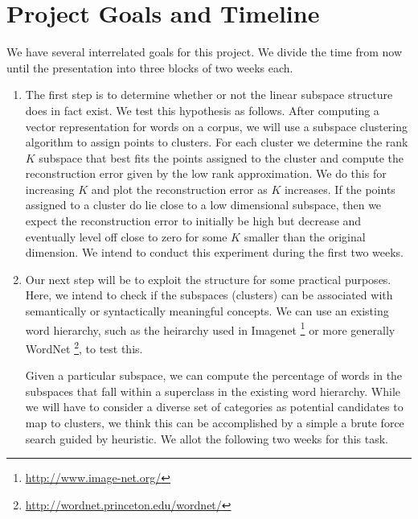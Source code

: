 \section{Project Goals and Timeline}\label{sec:timeline}

We have several interrelated goals for this project. 
We divide the time from now until the presentation into three blocks of two weeks each.
 \begin{enumerate}
\item The first step is to determine whether or not the linear subspace structure does in fact exist. 
We test this hypothesis as follows. 
 After computing a vector representation for words on a corpus, we will use a subspace clustering algorithm to assign points to clusters. 
For each cluster we determine the rank $K$ subspace that best fits the points assigned to the cluster and compute the reconstruction error given by the low rank approximation. 
We do this for increasing $K$ and plot the reconstruction error as $K$ increases. 
If the points assigned to a cluster do lie close to a low dimensional subspace, then we expect the reconstruction error to initially be high but decrease and eventually level off close to zero for some $K$ smaller than the original dimension. 
We intend to conduct this experiment during the first two weeks.
 
\item Our next step will be to exploit the structure for some practical purposes. 
Here, we intend to check if the subspaces (clusters) can be associated with semantically or syntactically meaningful concepts. 
We can use an existing word hierarchy, such as the heirarchy used in Imagenet \footnote{\url{http://www.image-net.org/}} or more generally  WordNet \footnote{\url{http://wordnet.princeton.edu/wordnet/}}, to test this. 
 
Given a particular subspace, we can compute the percentage of words in the subspaces that fall within a superclass in the existing word hierarchy. While we will have to consider a diverse set of categories as potential candidates to map to clusters, we think this can be accomplished by a simple a brute force search guided by heuristic. We allot the following two weeks for this task. 


\end{enumerate}
